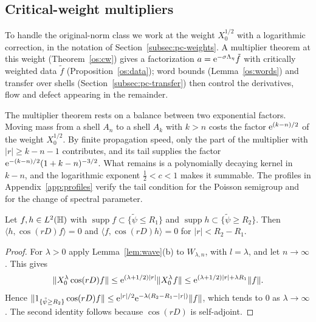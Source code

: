 \newcommand{\osomc}{\omega_c}        %
\newcommand{\osomp}{\omega}          %
\newcommand{\osX}{X_0}               %
\newcommand{\osL}{\ell}              %
\newcommand{\osHK}{\widetilde p}     %
\newcommand{\osLam}{\Lambda}         %

\subsection{Critical-weight multipliers}\label{app:o1st}

To handle the original-norm class we work at the weight $X_0^{1/2}$ with a logarithmic correction, in the notation of
Section~\ref{subsec:pc-weights}. A multiplier theorem at this weight (Theorem~\ref{os:cw}) gives a factorization
$a=\mathrm{e}^{-\sigma\Lambda_\eta}\tilde f$ with critically weighted data $\tilde f$ (Proposition~\ref{os:data}); word bounds
(Lemma~\ref{os:words}) and transfer over shells (Section~\ref{subsec:pc-transfer}) then control the derivatives, flow and defect
appearing in the remainder.

The multiplier theorem rests on a balance between two exponential factors. Moving mass from a shell $A_n$ to a shell $A_k$
with $k>n$ costs the factor $\mathrm{e}^{(k-n)/2}$ of the weight $X_0^{1/2}$. By finite propagation speed, only the part of the
multiplier with $|r|\ge k-n-1$ contributes, and its tail supplies the factor $\mathrm{e}^{-(k-n)/2}(1+k-n)^{-3/2}$. What remains is a
polynomially decaying kernel in $k-n$, and the logarithmic exponent $\tfrac12<c<1$ makes it summable. The profiles in
Appendix~\ref{app:profiles} verify the tail condition for the Poisson semigroup and for the change of spectral parameter.

\begin{lemma}\label{os:speed}
Let $f,h\in L^2(\mathbb{H})$ with $\operatorname{supp}f\subset\{\tilde\psi\le R_1\}$ and $\operatorname{supp}h\subset\{\tilde\psi\ge R_2\}$. Then
$\langle h,\cos(rD)f\rangle=0$ and $\langle f,\cos(rD)h\rangle=0$ for $|r|<R_2-R_1$.
\end{lemma}
\begin{proof}
For $\lambda>0$ apply Lemma~\ref{lem:wave}(b) to $W_{\lambda,n}$, with $l=\lambda$, and let $n\to\infty$. This gives
\[
\norm{\osX^\lambda\cos(rD)f}\le\ue^{(\lambda+1/2)|r|}\norm{\osX^\lambda f}\le\ue^{(\lambda+1/2)|r|+\lambda R_1}\norm f.
\]
Hence
$\lVert 1_{\{\tilde\psi\ge R_2\}}\cos(rD)f\rVert\le\mathrm{e}^{|r|/2}\mathrm{e}^{-\lambda(R_2-R_1-|r|)}\lVert f\rVert$, which tends to $0$ as $\lambda\to\infty$. The second identity follows
because $\cos(rD)$ is self-adjoint.
\end{proof}

